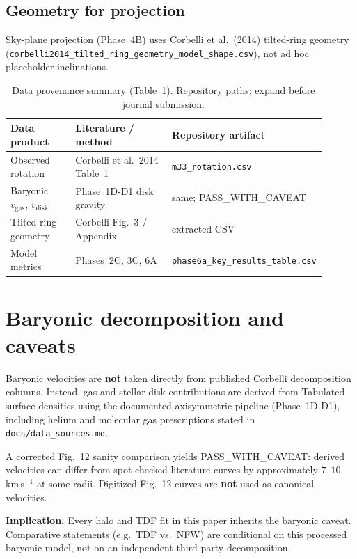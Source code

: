 \documentclass[11pt,a4paper]{article}
\begin{document}
\subsection{Geometry for projection}

Sky-plane projection (Phase~4B) uses Corbelli et al.\ (2014) tilted-ring geometry (\texttt{corbelli2014\_tilted\_ring\_geometry\_model\_shape.csv}), not ad hoc placeholder inclinations.

\begin{table}[ht]
  \centering
  \caption{Data provenance summary (Table~1). Repository paths; expand before journal submission.}
  \label{tab:provenance}
  \begin{tabular}{>{\raggedright\arraybackslash}p{0.22\linewidth}p{0.34\linewidth}p{0.34\linewidth}}
    \toprule
    Data product & Literature / method & Repository artifact \\
    \midrule
    Observed rotation & Corbelli et al.\ 2014 Table~1 & \texttt{m33\_rotation.csv} \\
    Baryonic $v_{\mathrm{gas}}$, $v_{\mathrm{disk}}$ & Phase~1D-D1 disk gravity & same; PASS\_WITH\_CAVEAT \\
    Tilted-ring geometry & Corbelli Fig.~3 / Appendix & extracted CSV \\
    Model metrics & Phases~2C, 3C, 6A & \texttt{phase6a\_key\_results\_table.csv} \\
    \bottomrule
  \end{tabular}
\end{table}

\section{Baryonic decomposition and caveats}
\label{sec:baryons}

Baryonic velocities are \textbf{not} taken directly from published Corbelli decomposition columns.
Instead, gas and stellar disk contributions are derived from Tabulated surface densities using the documented axisymmetric pipeline (Phase~1D-D1), including helium and molecular gas prescriptions stated in \texttt{docs/data\_sources.md}.

A corrected Fig.~12 sanity comparison yields PASS\_WITH\_CAVEAT: derived velocities can differ from spot-checked literature curves by approximately $7$--$10$\,km\,s$^{-1}$ at some radii.
Digitized Fig.~12 curves are \textbf{not} used as canonical velocities.

\textbf{Implication.} Every halo and TDF fit in this paper inherits the baryonic caveat.
Comparative statements (e.g.\ TDF vs.\ NFW) are conditional on this processed baryonic model, not on an independent third-party decomposition.
\end{document}
